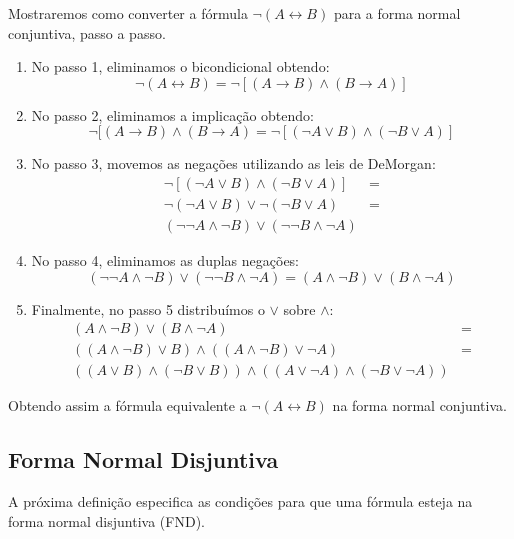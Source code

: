 \begin{Example}
Mostraremos como converter a fórmula $\neg (A\leftrightarrow B)$ para
a forma normal conjuntiva, passo a passo.
\begin{enumerate}
  \item No passo 1, eliminamos o bicondicional
    obtendo: \[\neg(A\leftrightarrow B) = \neg[(A \to
    B)\land (B\to A)]\]
  \item No passo 2, eliminamos a implicação obtendo:
   \[\neg[(A \to
    B)\land (B\to A)  = \neg[(\neg A \lor B) \land (\neg B \lor A)]\]
  \item No passo 3, movemos as negações utilizando as leis de
    DeMorgan:
   \[
       \begin{array}{lc}
         \neg[(\neg A \lor B) \land (\neg B \lor A)] & =\\
         \neg (\neg A \lor B) \lor \neg (\neg B \lor A) & = \\
         (\neg\neg A \land \neg B) \lor (\neg\neg B\land\neg A)
       \end{array}
   \]
   \item No passo 4, eliminamos as duplas negações:
  \[         (\neg\neg A \land \neg B) \lor (\neg\neg B\land\neg A) =
  (A \land \neg B) \lor (B\land\neg A)\]
  \item Finalmente, no passo 5 distribuímos o $\lor$ sobre $\land$:
  \[
      \begin{array}{lc}
        (A \land \neg B) \lor (B\land\neg A) & = \\
        ((A\land \neg B) \lor B) \land ((A \land \neg B) \lor \neg A)
        & = \\
        ((A \lor B) \land (\neg B \lor B)) \land ((A \lor \neg A)
        \land (\neg B \lor \neg A))
      \end{array}
  \]
\end{enumerate}
Obtendo assim a fórmula equivalente a $\neg (A\leftrightarrow B)$ na
forma normal conjuntiva.
\end{Example}


\subsection{Forma Normal Disjuntiva}


A próxima definição especifica as condições para que uma fórmula
esteja na forma normal disjuntiva (FND).

